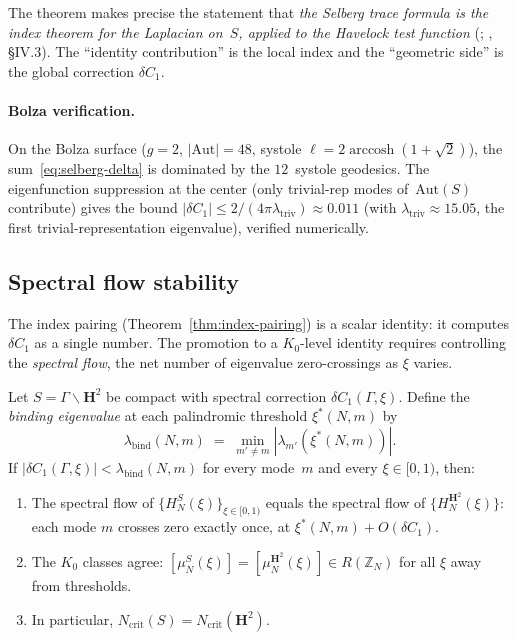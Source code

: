 \noindent
The theorem makes precise the statement that
\emph{the Selberg trace formula is the index theorem for the
Laplacian on~$S$, applied to the Havelock test function}
(\citealt{BarbaschMoscovici1983}; \citealt{Connes1994}, \S IV.3).
The ``identity contribution'' is the local index and the
``geometric side'' is the global correction $\delta C_1$.

\paragraph{Bolza verification.}
On the Bolza surface ($g = 2$, $|\mathrm{Aut}| = 48$,
systole $\ell = 2\operatorname{arccosh}(1{+}\sqrt{2})$),
the sum~\eqref{eq:selberg-delta} is dominated by the
$12$~systole geodesics.  The eigenfunction suppression at the
center (only trivial-rep modes of~$\mathrm{Aut}(S)$ contribute)
gives the bound $|\delta C_1| \le 2/(4\pi\lambda_{\mathrm{triv}})
\approx 0.011$ (with $\lambda_{\mathrm{triv}} \approx 15.05$,
the first trivial-representation eigenvalue),
verified numerically.

\subsection{Spectral flow stability}
\label{sec:spectral-flow}

The index pairing (Theorem~\ref{thm:index-pairing}) is a
scalar identity: it computes $\delta C_1$ as a single number.
The promotion to a $K_0$-level identity requires controlling
the \emph{spectral flow}, the net number of eigenvalue
zero-crossings as $\xi$ varies.

\begin{theorem}
\label{thm:spectral-flow}
Let $S = \Gamma\backslash\mathbf{H}^2$ be compact with
spectral correction $\delta C_1(\Gamma, \xi)$.
Define the \emph{binding eigenvalue} at each palindromic
threshold $\xi^*(N,m)$ by
\[
  \lambda_{\mathrm{bind}}(N,m)
  \;=\; \min_{m' \ne m} |\lambda_{m'}(\xi^*(N,m))|.
\]
If\/ $|\delta C_1(\Gamma, \xi)| < \lambda_{\mathrm{bind}}(N,m)$
for every mode~$m$ and every $\xi \in [0,1)$, then:
\begin{enumerate}
  \item The spectral flow of $\{H_N^S(\xi)\}_{\xi \in [0,1)}$
    equals the spectral flow of $\{H_N^{\mathbf{H}^2}(\xi)\}$:
    each mode $m$ crosses zero exactly once, at
    $\xi^*(N,m) + O(\delta C_1)$.
  \item The $K_0$ classes agree:
    $[\mu_N^S(\xi)] = [\mu_N^{\mathbf{H}^2}(\xi)]
    \in R(\mathbb{Z}_N)$
    for all $\xi$ away from thresholds.
  \item In particular, $N_{\mathrm{crit}}(S) = N_{\mathrm{crit}}(\mathbf{H}^2)$.
\end{enumerate}
\end{theorem}

